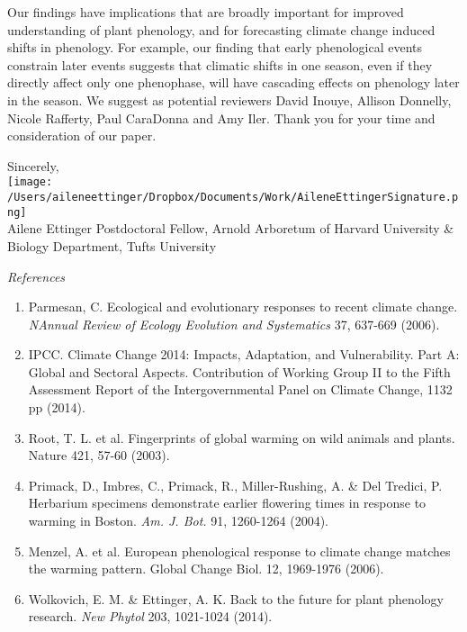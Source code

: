 \documentclass[11pt,a4paper]{letter}
\begin{document}
\begin{letter}{}
Our findings have implications that are broadly important for improved understanding of plant phenology, and for forecasting climate change induced shifts in phenology. For example, our finding that early phenological events constrain later events suggests that climatic shifts in one season, even if they directly affect only one phenophase, will have cascading effects on phenology later in the season. 
We suggest as potential reviewers David Inouye, Allison Donnelly, Nicole Rafferty, Paul CaraDonna and Amy Iler. Thank you for your time and consideration of our paper. 


Sincerely,\\

\texttt{[image: /Users/aileneettinger/Dropbox/Documents/Work/AileneEttingerSignature.png]} \\
Ailene Ettinger
Postdoctoral Fellow, Arnold Arboretum of Harvard University \& Biology Department, Tufts University

\noindent \emph{References}
\begin{footnotesize}
\begin{enumerate}
\item Parmesan, C. Ecological and evolutionary responses to recent climate change.  \emph{NAnnual Review of Ecology Evolution and Systematics} 37, 637-669 (2006).
\item  IPCC. Climate Change 2014: Impacts, Adaptation, and Vulnerability. Part A: Global and Sectoral Aspects. Contribution of Working Group II to the Fifth Assessment Report of the Intergovernmental Panel on Climate Change, 1132 pp (2014).
\item Root, T. L. et al. Fingerprints of global warming on wild animals and plants. Nature 421, 57-60 (2003).
\item Primack, D., Imbres, C., Primack, R., Miller-Rushing, A. & Del Tredici, P. Herbarium specimens demonstrate earlier flowering times in response to warming in Boston.  \emph{Am. J. Bot.} 91, 1260-1264 (2004).
\item Menzel, A. et al. European phenological response to climate change matches the warming pattern. Global Change Biol. 12, 1969-1976 (2006).
\item Wolkovich, E. M. & Ettinger, A. K. Back to the future for plant phenology research. \emph{New Phytol} 203, 1021-1024 (2014).
\end{enumerate}
\end{footnotesize}



\end{letter}
\end{document}
